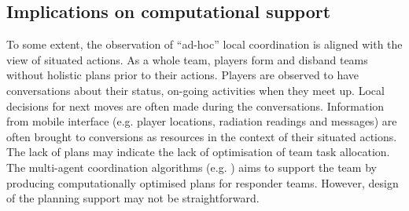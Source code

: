 
\subsection{Implications on computational support}

To some extent, the observation of ``ad-hoc'' local coordination is aligned with the view of situated actions. As a whole team, players form and disband teams without holistic plans prior to their actions. Players are observed to have conversations about their status, on-going activities when they meet up. Local decisions for next moves are often made during the conversations.  Information from mobile interface (e.g. player locations, radiation readings and messages) are often brought to conversions as resources in the context of their situated actions. \\

The lack of plans may indicate the lack of optimisation of team task allocation. The multi-agent coordination algorithms (e.g. \cite{Ramchurn2010}) aims to support the team by producing computationally optimised plans for responder teams. However, design of the planning support may not be straightforward. \\

